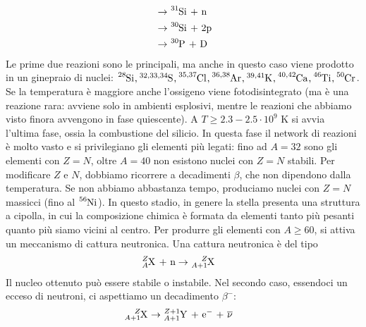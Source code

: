 \documentclass[a4paper,11pt]{article}
\theoremstyle{theorem}
\theoremstyle{definition}
\begin{document}
\begin{itemize}
\begin{align*}
			&\rightarrow \tensor[^{31}]{\mathrm{Si}}{}\textrm{ + n}\\
			&\rightarrow \tensor[^{30}]{\mathrm{Si}}{}\textrm{ + 2p}\\
			&\rightarrow \tensor[^{30}]{\mathrm{P}}{}\textrm{ + D}\\
		\end{align*}
		Le prime due reazioni sono le principali, ma anche in questo caso viene prodotto in un ginepraio di nuclei: $\tensor[^{28}]{\mathrm{Si}}{},\tensor[^{32,33,34}]{\mathrm{S}}{},\tensor[^{35,37}]{\mathrm{Cl}}{},\tensor[^{36,38}]{\mathrm{Ar}}{},\tensor[^{39,41}]{\mathrm{K}}{},\tensor[^{40,42}]{\mathrm{Ca}}{},\tensor[^{46}]{\mathrm{Ti}}{},\tensor[^{50}]{\mathrm{Cr}}{}$. Se la temperatura è maggiore anche l'ossigeno viene fotodisintegrato (ma è una reazione rara: avviene solo in ambienti esplosivi, mentre le reazioni che abbiamo visto finora avvengono in fase quiescente). A $T\geq 2.3-2.5\cdot10^9$ K si avvia l'ultima fase, ossia la combustione del silicio. In questa fase il network di reazioni è molto vasto e si privilegiano gli elementi più legati: fino ad $A=32$ sono gli elementi con $Z=N$, oltre $A=40$ non esistono nuclei con $Z=N$ stabili. Per modificare $Z$ e $N$, dobbiamo ricorrere a decadimenti $\beta$, che non dipendono dalla temperatura. Se non abbiamo abbastanza tempo, produciamo nuclei con $Z=N$ massicci (fino al $\tensor[^{56}]{\mathrm{Ni}}{}$). In questo stadio, in genere la stella presenta una struttura a cipolla, in cui la composizione chimica è formata da elementi tanto più pesanti quanto più siamo vicini al centro. Per produrre gli elementi con $A\geq60$, si attiva un meccanismo di cattura neutronica. Una cattura neutronica è del tipo
		\begin{align*}
			\tensor*[^{Z}_A]{\mathrm{X}}{}\textrm{ + n}&\rightarrow \tensor*[^{Z}_{A+1}]{\mathrm{X}}{}
		\end{align*}
		Il nucleo ottenuto può essere stabile o instabile. Nel secondo caso, essendoci un ecceso di neutroni, ci aspettiamo un decadimento $\beta^-$:
		\begin{align*}
			\tensor*[^{Z}_{A+1}]{\mathrm{X}}{}&\rightarrow\tensor*[^{Z+1}_{A+1}]{\mathrm{Y}}{}\textrm{ + e$^-$ + }\overline{\nu}
		\end{align*}

\end{itemize}
\end{document}
